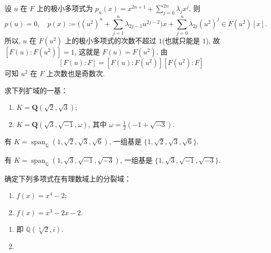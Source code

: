\begin{solution}
    设 $u$ 在 $F$ 上的极小多项式为 $p_{u}(x)=x^{2n+1}+\sum_{j=0}^{2n}\lambda_{j}x^{j}$. 
    则 
        \[
            p(u)=0,\quad p(x)\coloneqq \Big((u^{2})^{n}+\sum_{j=1}^{n}\lambda_{2j-1}u^{2j-2}\Big)x+\sum_{j=0}^{n}\lambda_{2j}(u^{2})^{j}\in F(u^{2})[x].
        \]
    所以, $u$ 在 $F(u^{2})$ 上的极小多项式的次数不超过 $1$(也就只能是 $1$), 故 $[F(u):F(u^{2})]=1$, 这就是 $F(u)=F(u^{2})$. 由 
        \[
            [F(u):F]=[F(u):F(u^{2})] [F(u^{2}):F]
        \]
    可知 $u^{2}$ 在 $F$ 上次数也是奇数次.
\end{solution}

\setcounter{pb}{6}
\begin{problem}
    求下列扩域的一基：
    \begin{enumerate}[label=(\roman*)]
        \item $ K = \mathbf{Q}(\sqrt{2}, \sqrt{3}) $;
        \item $ K = \mathbf{Q}(\sqrt{3}, \sqrt{-1}, \omega) $, 其中 $ \omega = \frac{1}{2}(-1 + \sqrt{-3}) $.
    \end{enumerate}
\end{problem}

\begin{solution}
    有 $K=\operatorname{span}_{\mathbb{Q}}(1,\sqrt{2},\sqrt{3},\sqrt{6})$, 一组基是 $\{1,\sqrt{2},\sqrt{3},\sqrt{6}\}$.
    \par 有 $K=\operatorname{span}_{\mathbb{Q}}(1,\sqrt{3},\sqrt{-1},\sqrt{-3})$, 一组基是 $\{1,\sqrt{3},\sqrt{-1},\sqrt{-3}\}$.
\end{solution}

\setcounter{pb}{10}
\begin{problem}
    确定下列多项式在有理数域上的分裂域：
    \begin{enumerate}[label=(\roman*)]
        \item $ f(x) = x^4 - 2 $;
        \item $ f(x) = x^3 - 2x - 2 $.
    \end{enumerate}
\end{problem}

\begin{solution}
\begin{enumerate}[label=(\roman*)]
    \item 即 $\mathbb{Q}(\sqrt[4]{2},i)$.
    \item 
\end{enumerate}
\end{solution}

